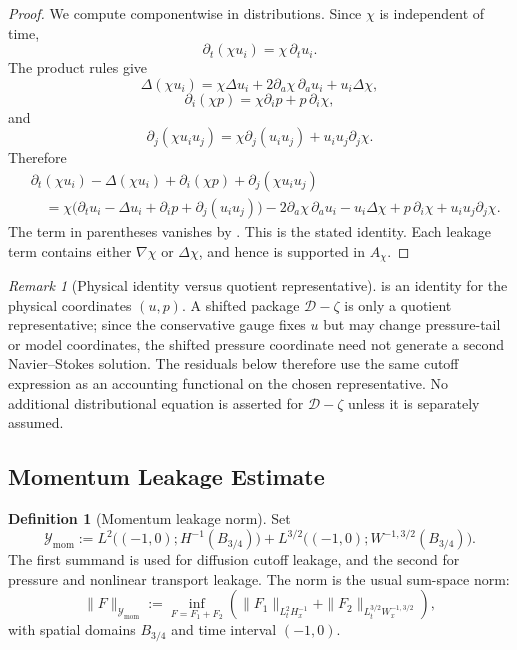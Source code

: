 \documentclass[11pt]{article}
\numberwithin{equation}{section}
\theoremstyle{definition}
\newtheorem{definition}[definition]{Definition}
\theoremstyle{remark}
\newtheorem{remark}[remark]{Remark}
\newcommand{\mom}{\mathrm{mom}}
\newcommand{\calD}{\mathcal D}
\newcommand{\Ymom}{\mathcal Y_{\mom}}
\begin{document}
\begin{proof}
We compute componentwise in distributions.  Since \(\chi\) is independent of
time,
\[
    \partial_t(\chi u_i)=\chi\,\partial_tu_i.
\]
The product rules give
\[
    \Delta(\chi u_i)
    =
    \chi\Delta u_i
    +
    2\partial_a\chi\,\partial_a u_i
    +
    u_i\Delta\chi,
\]
\[
    \partial_i(\chi p)
    =
    \chi\partial_i p+p\,\partial_i\chi,
\]
and
\[
    \partial_j(\chi u_i u_j)
    =
    \chi\partial_j(u_i u_j)
    +
    u_i u_j\partial_j\chi.
\]
Therefore
\[
\begin{aligned}
&\partial_t(\chi u_i)-\Delta(\chi u_i)
    +\partial_i(\chi p)
    +\partial_j(\chi u_i u_j)\\
&\quad =
\chi\bigl(\partial_tu_i-\Delta u_i+\partial_i p+\partial_j(u_i u_j)\bigr)
-2\partial_a\chi\,\partial_a u_i
-u_i\Delta\chi
+p\,\partial_i\chi
+u_i u_j\partial_j\chi.
\end{aligned}
\]
The term in parentheses vanishes by .  This
is the stated identity.  Each leakage term contains either \(\nabla\chi\) or
\(\Delta\chi\), and hence is supported in \(A_\chi\).
\end{proof}

\begin{remark}[Physical identity versus quotient representative]
\label{loc:rem:physical-vs-quotient-identity}
 is an identity for the physical
coordinates \((u,p)\).  A shifted package \(\calD-\zeta\) is only a quotient
representative; since the conservative gauge fixes \(u\) but may change
pressure-tail or model coordinates, the shifted pressure coordinate need not
generate a second Navier--Stokes solution.  The residuals below therefore use
the same cutoff expression as an accounting functional on the chosen
representative.  No additional distributional equation is asserted for
\(\calD-\zeta\) unless it is separately assumed.
\end{remark}

\subsection{Momentum Leakage Estimate}
\label{loc:sec:momentum-estimate}

\begin{definition}[Momentum leakage norm]
\label{loc:def:momentum-leakage-norm}
Set
\[
    \Ymom
    :=
    L^2\bigl((-1,0);H^{-1}(B_{3/4})\bigr)
    +
    L^{3/2}\bigl((-1,0);W^{-1,3/2}(B_{3/4})\bigr).
\]
The first summand is used for diffusion cutoff leakage, and the second for
pressure and nonlinear transport leakage.
The norm is the usual sum-space norm:
\[
    \|F\|_{\Ymom}
    :=
    \inf_{F=F_1+F_2}
    \left(
        \|F_1\|_{L^2_tH^{-1}_x}
        +
        \|F_2\|_{L^{3/2}_tW^{-1,3/2}_x}
    \right),
\]
with spatial domains \(B_{3/4}\) and time interval \((-1,0)\).
\end{definition}
\end{document}
